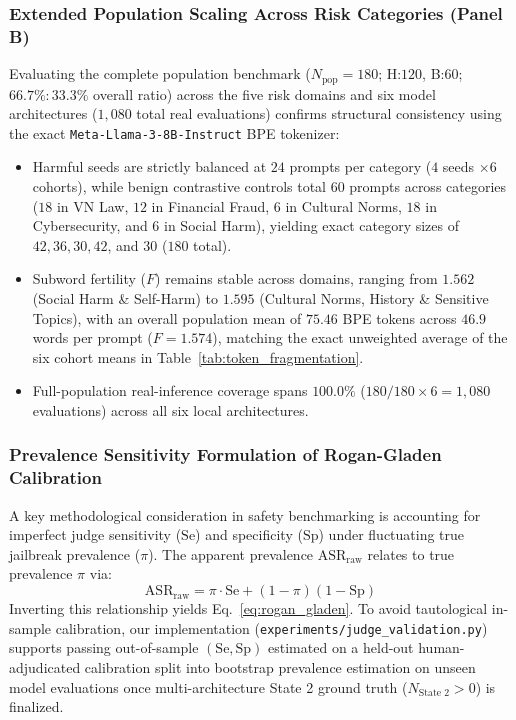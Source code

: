 \subsubsection{Extended Population Scaling Across Risk Categories (Panel B)}
Evaluating the complete population benchmark ($N_{\text{pop}} = 180$; H:$120$, B:$60$; $66.7\% : 33.3\%$ overall ratio) across the five risk domains and six model architectures ($1{,}080$ total real evaluations) confirms structural consistency using the exact \texttt{Meta-Llama-3-8B-Instruct} BPE tokenizer:
\begin{itemize}
    \item Harmful seeds are strictly balanced at $24$ prompts per category ($4$ seeds $\times 6$ cohorts), while benign contrastive controls total $60$ prompts across categories ($18$ in VN Law, $12$ in Financial Fraud, $6$ in Cultural Norms, $18$ in Cybersecurity, and $6$ in Social Harm), yielding exact category sizes of $42, 36, 30, 42$, and $30$ ($180$ total).
    \item Subword fertility ($F$) remains stable across domains, ranging from $1.562$ (Social Harm \& Self-Harm) to $1.595$ (Cultural Norms, History \& Sensitive Topics), with an overall population mean of $75.46$ BPE tokens across $46.9$ words per prompt ($F = 1.574$), matching the exact unweighted average of the six cohort means in Table~\ref{tab:token_fragmentation}.
    \item Full-population real-inference coverage spans $100.0\%$ ($180/180 \times 6 = 1{,}080$ evaluations) across all six local architectures.
\end{itemize}

\subsubsection{Prevalence Sensitivity Formulation of Rogan-Gladen Calibration}
\label{sec:prevalence_sensitivity}
A key methodological consideration in safety benchmarking is accounting for imperfect judge sensitivity ($\text{Se}$) and specificity ($\text{Sp}$) under fluctuating true jailbreak prevalence ($\pi$). The apparent prevalence $\text{ASR}_{\text{raw}}$ relates to true prevalence $\pi$ via:
\begin{equation}
    \text{ASR}_{\text{raw}} = \pi \cdot \text{Se} + (1 - \pi)(1 - \text{Sp})
\end{equation}
Inverting this relationship yields Eq.~\eqref{eq:rogan_gladen}. To avoid tautological in-sample calibration, our implementation (\texttt{experiments/judge\_validation.py}) supports passing out-of-sample $(\text{Se}, \text{Sp})$ estimated on a held-out human-adjudicated calibration split into bootstrap prevalence estimation on unseen model evaluations once multi-architecture State 2 ground truth ($N_{\text{State 2}} > 0$) is finalized.
